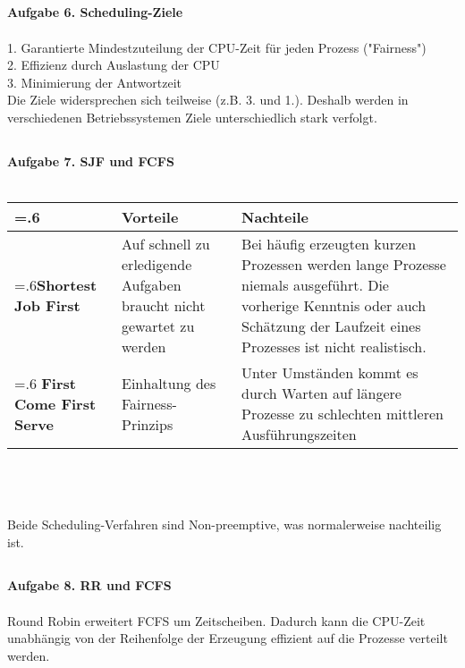 \documentclass{article}
\begin{document}
\pagebreak
\subsection*{}
\textbf {Aufgabe 6. Scheduling-Ziele} \\ \\
1. Garantierte Mindestzuteilung der CPU-Zeit für jeden Prozess ("Fairness") \\
2. Effizienz durch Auslastung der CPU \\
3. Minimierung der Antwortzeit \\
Die Ziele widersprechen sich teilweise (z.B. 3. und 1.). Deshalb werden in
verschiedenen Betriebssystemen Ziele unterschiedlich stark verfolgt.

\subsection*{}
\textbf {Aufgabe 7. SJF und FCFS} \\ \\
\begin{tabularx}{\textwidth}{>{\hsize=.6\hsize}X|>{\hsize=1.2\hsize}X|>{\hsize=1.2\hsize}X}
 & \textbf{Vorteile} & \textbf{Nachteile} \\
\hline
\textbf{Shortest Job First} &
Auf schnell zu erledigende Aufgaben braucht nicht gewartet zu werden &
Bei häufig erzeugten kurzen Prozessen werden lange Prozesse niemals ausgeführt.
Die vorherige Kenntnis oder auch Schätzung der Laufzeit eines Prozesses ist nicht
realistisch. \\
\hline
\textbf{First Come First Serve} &
Einhaltung des Fairness-Prinzips &
Unter Umständen kommt es durch Warten auf längere Prozesse zu schlechten
 mitt\-leren Ausführungszeiten \\
\end{tabularx}
\\ \\ \\
Beide Scheduling-Verfahren sind Non-preemptive, was normalerweise nachteilig ist.

\subsection*{}
\textbf {Aufgabe 8. RR und FCFS} \\ \\
Round Robin erweitert FCFS um Zeitscheiben. Dadurch kann die CPU-Zeit unabhängig
von der Reihenfolge der Erzeugung effizient auf die Prozesse verteilt werden.
\end{document}
